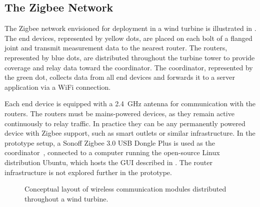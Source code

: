 \subsection{The Zigbee Network}
\label{sec:zigbee_network}

The Zigbee network envisioned for deployment in a wind turbine is illustrated in . The end devices, represented by yellow dots, are placed on each bolt of a flanged joint and transmit measurement data to the nearest router. The routers, represented by blue dots, are distributed throughout the turbine tower to provide coverage and relay data toward the coordinator. The coordinator, represented by the green dot, collects data from all end devices and forwards it to a server application via a WiFi connection.
 
Each end device is equipped with a \SI{2.4}{\giga\hertz} antenna for communication with the routers. The routers must be mains-powered devices, as they remain active continuously to relay traffic. In practice they can be any permanently powered device with Zigbee support, such as smart outlets or similar infrastructure. In the prototype setup, a Sonoff Zigbee 3.0 USB Dongle Plus is used as the coordinator~\cite{sonoff_zbdongle_p}, connected to a computer running the open-source Linux distribution Ubuntu, which hosts the GUI described in . The router infrastructure is not explored further in the prototype.

\begin{figure}
\centering

    \caption{Conceptual layout of wireless communication modules distributed throughout a wind turbine.}
    \label{fig:WC_Overview}
\end{figure}
 